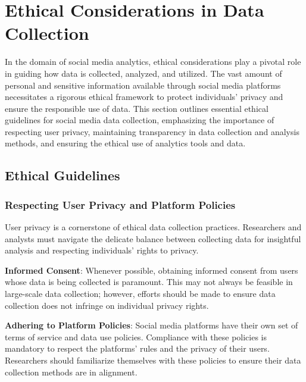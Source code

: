 \documentclass[
]{book}
\begin{document}
\hypertarget{ethical-considerations-in-data-collection}{%
\section*{Ethical Considerations in Data Collection}\label{ethical-considerations-in-data-collection}}

In the domain of social media analytics, ethical considerations play a pivotal role in guiding how data is collected, analyzed, and utilized. The vast amount of personal and sensitive information available through social media platforms necessitates a rigorous ethical framework to protect individuals' privacy and ensure the responsible use of data. This section outlines essential ethical guidelines for social media data collection, emphasizing the importance of respecting user privacy, maintaining transparency in data collection and analysis methods, and ensuring the ethical use of analytics tools and data.

\hypertarget{ethical-guidelines}{%
\subsection*{Ethical Guidelines}\label{ethical-guidelines}}

\hypertarget{respecting-user-privacy-and-platform-policies}{%
\subsubsection*{Respecting User Privacy and Platform Policies}\label{respecting-user-privacy-and-platform-policies}}

User privacy is a cornerstone of ethical data collection practices. Researchers and analysts must navigate the delicate balance between collecting data for insightful analysis and respecting individuals' rights to privacy.

\textbf{Informed Consent}: Whenever possible, obtaining informed consent from users whose data is being collected is paramount. This may not always be feasible in large-scale data collection; however, efforts should be made to ensure data collection does not infringe on individual privacy rights.

\textbf{Adhering to Platform Policies}: Social media platforms have their own set of terms of service and data use policies. Compliance with these policies is mandatory to respect the platforms' rules and the privacy of their users. Researchers should familiarize themselves with these policies to ensure their data collection methods are in alignment.
\end{document}
